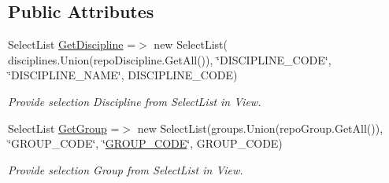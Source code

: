 \subsection*{Public Attributes}
\begin{DoxyCompactItemize}
\item 
Select\+List \hyperlink{class_in_study_asp_1_1_models_1_1_user_1_1_teacher_1_1_view_model_schedule_a3cb89808a0e815b09f1085e3b945066c}{Get\+Discipline} =$>$ new Select\+List( disciplines.\+Union(repo\+Discipline.\+Get\+All()), \char`\"{}D\+I\+S\+C\+I\+P\+L\+I\+N\+E\+\_\+\+C\+O\+DE\char`\"{}, \char`\"{}D\+I\+S\+C\+I\+P\+L\+I\+N\+E\+\_\+\+N\+A\+ME\char`\"{}, D\+I\+S\+C\+I\+P\+L\+I\+N\+E\+\_\+\+C\+O\+DE)
\begin{DoxyCompactList}\small\item\em Provide selection Discipline from Select\+List in View. \end{DoxyCompactList}\item 
Select\+List \hyperlink{class_in_study_asp_1_1_models_1_1_user_1_1_teacher_1_1_view_model_schedule_a16df99554d08b246ecfa66acb8a6238c}{Get\+Group} =$>$ new Select\+List(groups.\+Union(repo\+Group.\+Get\+All()), \char`\"{}G\+R\+O\+U\+P\+\_\+\+C\+O\+DE\char`\"{}, \char`\"{}\hyperlink{class_e_f_oracle_1_1_model_1_1_s_c_h_e_d_u_l_e_aa0b33a5dbbf6c590afd18a5589e5427f}{G\+R\+O\+U\+P\+\_\+\+C\+O\+DE}\char`\"{}, G\+R\+O\+U\+P\+\_\+\+C\+O\+DE)
\begin{DoxyCompactList}\small\item\em Provide selection Group from Select\+List in View. \end{DoxyCompactList}\end{DoxyCompactItemize}
